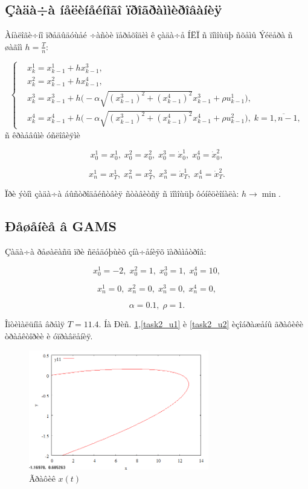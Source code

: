 \documentclass[14pt]{article}
\begin{document}
\subsection{Çàäà÷à íåëèíåéíîãî ïðîãðàììèðîâàíèÿ}

Àíàëîãè÷íî ïðåäûäóùåé ÷àñòè ïåðåõîäèì ê çàäà÷å ÍËÏ ñ ïîìîùüþ ñõåìû Ýéëåðà ñ øàãîì $h = \frac{T}{n}$:

\begin{equation}\label{NLP2}
\left\{ \begin{aligned}
& x^1_{k} = x^1_{k-1} + h x^3_{k-1}, \\
& x^2_{k} = x^2_{k-1} + h x^4_{k-1}, \\
& x^3_{k} = x^3_{k-1} + h \Big(-\alpha \sqrt{(x^3_{k-1})^2+(x^4_{k-1})^2} x^3_{k-1} + \rho u^1_{k-1} \Big), \\
& x^4_{k} = x^4_{k-1} + h \Big(-\alpha \sqrt{(x^3_{k-1})^2+(x^4_{k-1})^2} x^4_{k-1} + \rho u^2_{k-1} \Big), \; k = \overline{1,n-1},
\end{aligned}\right.
\end{equation}
ñ êðàåâûìè óñëîâèÿìè

$$
    x^1_0 = x^1_0,\; x^2_0 = x^2_0,\; x^3_0 = \dot x^1_0,\; x^4_0 = \dot x^2_0,
$$

$$
    x^1_n = x^1_T,\; x^2_n = x^2_T,\; x^3_n = \dot x^1_T,\; x^4_n = \dot x^2_T.
$$

Ïðè ýòîì çàäà÷à áûñòðîäåéñòâèÿ ñòàâèòñÿ ñ ïîìîùüþ ôóíêöèîíàëà: $h \rightarrow \min$.

\subsection{Ðåøåíèå â GAMS}

Çàäà÷à ðåøàëàñü ïðè ñëåäóþùèõ çíà÷åíèÿõ ïàðàìåòðîâ:

$$
    x^1_0 = -2,\; x^2_0 = 1,\; x^3_0 = 1,\; x^4_0 = 10,
$$

$$
    x^1_n = 0,\; x^2_n = 0,\; x^3_n = 0,\; x^4_n = 0,
$$

$$
    \alpha = 0.1,\; \rho = 1.
$$

Îïòèìàëüíîå âðåìÿ $ T = 11.4 $. Íà Ðèñ. \ref{task2_x},\ref{task2_u1} è \ref{task2_u2} èçîáðàæåíû ãðàôèêè òðàåêòîðèè è óïðàâëåíèÿ.

\begin{figure}
\centering
\includegraphics[width=0.7\textwidth]{task2_x}
\caption{Ãðàôèê $x(t)$}
\label{task2_x}
\end{figure}
\end{document}
